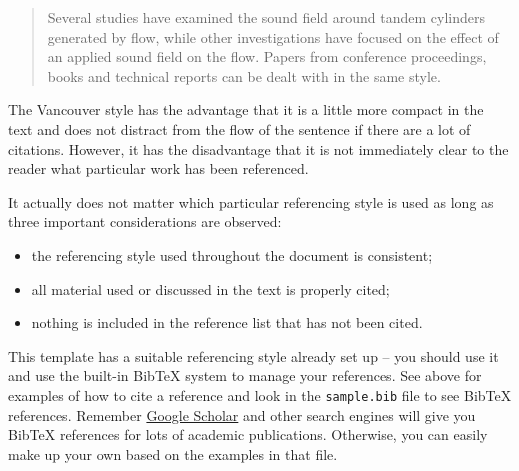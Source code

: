 \begin{quote}
	Several studies have examined the sound field around tandem cylinders generated by flow\cite{fitzpatrick2003flow,finnegan2010experimental}, while other investigations have focused on the effect of an applied sound field on the flow\cite{hall2003vortex}. Papers from conference proceedings\cite{jordan2001array}, books\cite{paidoussis2010fluid} and technical reports\cite{reyes2007power} can be dealt with in the same style.
\end{quote}

The Vancouver style has the advantage that it is a little more compact in the text and does not distract from the flow of the sentence if there are a lot of citations. However, it has the disadvantage that it is not immediately clear to the reader what particular work has been referenced.

It actually does not matter which particular referencing style is used as long as three important considerations are observed:
\begin{itemize}
	\item the referencing style used throughout the document is consistent;
	\item all material used or discussed in the text is properly cited;
	\item nothing is included in the reference list that has not been cited.
\end{itemize}

This template has a suitable referencing style already set up -- you should use it and use the built-in BibTeX system to manage your references. See above for examples of how to cite a reference and look in the \texttt{sample.bib} file to see BibTeX references. Remember \href{http://scholar.google.com}{Google Scholar} and other search engines will give you BibTeX references for lots of academic publications. Otherwise, you can easily make up your own based on the examples in that file.